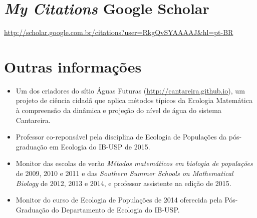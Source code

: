 \documentclass[a4paper ,11pt]{article}
\begin{document}
\section{\emph{My Citations} Google Scholar}
\url{http://scholar.google.com.br/citations?user=RkgQvSYAAAAJ&hl=pt-BR}

\section{Outras informações}
\begin{itemize}
    \item Um dos criadores do sítio Águas Futuras
        (\url{http://cantareira.github.io}), um projeto de ciência cidadã que
        aplica métodos típicos da Ecologia Matemática à compreensão da
        dinâmica e projeção do nível de água do sistema Cantareira.
    \item Professor co-reponsável pela disciplina de Ecologia de Populações da
pós-graduação em Ecologia do IB-USP de 2015.
    \item Monitor das escolas de verão \emph{Métodos matemáticos em biologia de
populações} de 2009, 2010 e 2011 e das \emph{Southern Summer Schools on Mathematical
Biology} de 2012, 2013 e 2014, e professor assistente na edição de 2015.
    \item Monitor do curso de Ecologia de Populações de 2014 oferecida pela Pós-Graduação do Departamento de
Ecologia do IB-USP.
\end{itemize}
\end{document}
